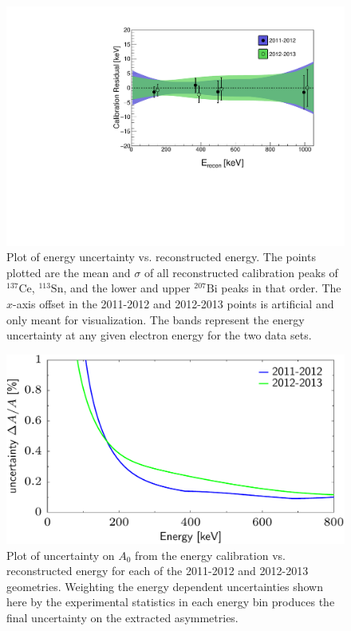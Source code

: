 \begin{figure}[h]
\centering
\includegraphics[scale=.65]{5-UCNAResults/energyErrorEnvelope_color.pdf}
\caption{Plot of energy uncertainty vs. reconstructed energy. The points plotted are the mean
  and $\sigma$ of all reconstructed calibration peaks of $^{137}\mathrm{Ce}$,
  $^{113}\mathrm{Sn}$, and the lower and
  upper $^{207}\mathrm{Bi}$ peaks in that order. The $x$-axis offset in the 2011-2012 and 2012-2013 points is
  artificial and only meant for visualization. The bands represent the energy uncertainty
  at any given electron energy for the two data sets.}
\label{fig:errEnv}
\end{figure}

\begin{figure}[h]
\centering
\includegraphics[scale=.50]{5-UCNAResults/EnergyUncertALL.pdf}
\caption{Plot of uncertainty on $A_0$ from the energy calibration vs. reconstructed energy
  for each of the 2011-2012 and 2012-2013 geometries. Weighting the energy dependent
  uncertainties shown here by the experimental statistics in each energy bin produces
  the final uncertainty on the extracted asymmetries.}
\label{fig:energyUncert}
\end{figure}

